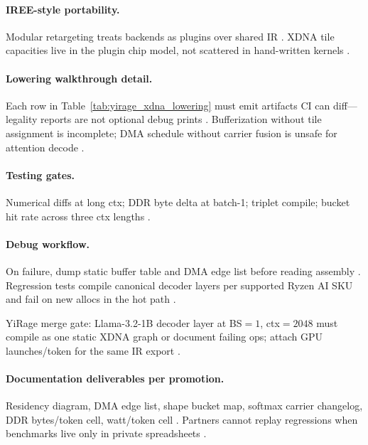 \paragraph{IREE-style portability.}
Modular retargeting treats backends as plugins over shared IR \citep{iree2024,yirage2026,chen2020compilerbasedhardw}.
XDNA tile capacities live in the plugin chip model, not scattered in hand-written kernels \citep{patel2025llminference,amd2024xdna,amd2024aie}.

\paragraph{Lowering walkthrough detail.}
Each row in Table~\ref{tab:yirage_xdna_lowering} must emit artifacts CI can diff---legality reports are not optional debug prints \citep{yirage2026,chen2020compilerbasedhardw,amd2024aie}.
Bufferization without tile assignment is incomplete; DMA schedule without carrier fusion is unsafe for attention decode \citep{dao2022flashattention,memoryfloor2026,patel2025llminference}.

\paragraph{Testing gates.}
Numerical diffs at long ctx; DDR byte delta at batch-1; triplet compile; bucket hit rate across three ctx lengths \citep{dao2023flashdecoding,yirage2026,amd2024xdna,amd2024aie,chen2020compilerbasedhardw,taxbreak2026,memoryfloor2026}.

\paragraph{Debug workflow.}
On failure, dump static buffer table and DMA edge list before reading assembly \citep{yirage2026,amd2024xdna}.
Regression tests compile canonical decoder layers per supported Ryzen AI SKU and fail on new allocs in the hot path \citep{amd2024aie,chen2020compilerbasedhardw}.

\begin{example}
YiRage merge gate: Llama-3.2-1B decoder layer at BS${=}1$, ctx${=}2048$ must compile as one static XDNA graph or document failing ops; attach GPU launches/token for the same IR export \citep{taxbreak2026,yirage2026,memoryfloor2026}.
\end{example}

\paragraph{Documentation deliverables per promotion.}
Residency diagram, DMA edge list, shape bucket map, softmax carrier changelog, DDR bytes/token cell, watt/token cell \citep{memoryfloor2026,taxbreak2026,yirage2026,patel2025llminference}.
Partners cannot replay regressions when benchmarks live only in private spreadsheets \citep{chen2020compilerbasedhardw,amd2024xdna}.


